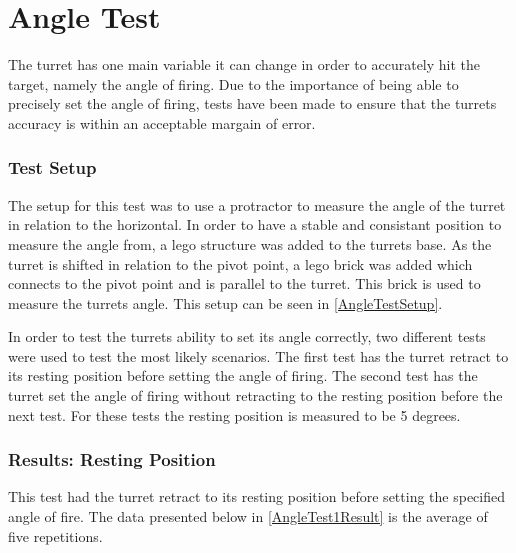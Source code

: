 \chapter{Angle Test}\label{angleTest}
The turret has one main variable it can change in order to accurately hit the
target, namely the angle of firing. Due to the importance of being able to
precisely set the angle of firing, tests have been made to ensure that the
turrets accuracy is within an acceptable margain of error.

\subsection{Test Setup}
The setup for this test was to use a protractor to measure the angle of the
turret in relation to the horizontal. In order to have a stable and
consistant position to measure the angle from, a lego structure was added to the
turrets base. As the turret is shifted in relation to the pivot point, a lego
brick was added which connects to the pivot point and is parallel to the turret.
This brick is used to measure the turrets angle. This setup can be seen in
\autoref{AngleTestSetup}.


In order to test the turrets ability to set its angle correctly, two different
tests were used to test the most likely scenarios. The first test has the turret
retract to its resting position before setting the angle of firing. The second
test has the turret set the angle of firing without retracting to the resting
position before the next test. For these tests the resting position is measured
to be 5 degrees.

\subsection{Results: Resting Position}
This test had the turret retract to its resting position before setting the
specified angle of fire. The data presented below in \autoref{AngleTest1Result}
is the average of five repetitions.

